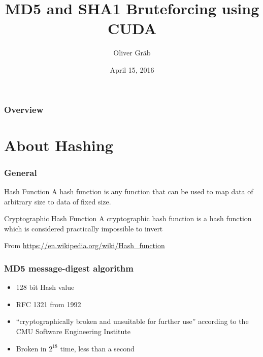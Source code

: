 \documentclass{beamer}
\title[CUDA-based Bruteforcing]{MD5 and SHA1 Bruteforcing using CUDA} %
\author{Oliver Gr\"ab} %
\institute[JGU] %
{
Johannes Gutenberg University Mainz \\ %
\medskip
\textit{ograeb@students.uni-mainz.de} %
}
\date{April 15, 2016} %
\begin{document}
\begin{frame}
\titlepage%
\end{frame}

\begin{frame}
\frametitle{Overview} %
\tableofcontents %
\end{frame}


\section{About Hashing}

\begin{frame}
	\frametitle{General}
	\begin{block}{Hash Function}
		A hash function is any function that can be used to map data of arbitrary size to data of fixed size.
	\end{block}
	\begin{block}{Cryptographic Hash Function}
		A cryptographic hash function is a hash function which is considered practically impossible to invert
	\end{block}
	\footnotesize From \url{https://en.wikipedia.org/wiki/Hash_function}
\end{frame}


\begin{frame}
	\frametitle{MD5 message-digest algorithm}
	\begin{itemize}
		\item 128 bit Hash value
		\item RFC 1321 from 1992
		\item ``cryptographically broken and unsuitable for further use'' according to the CMU Software Engineering Institute
		\item Broken in $2^{18}$ time, less than a second
	\end{itemize}
\end{frame}
\end{document}
